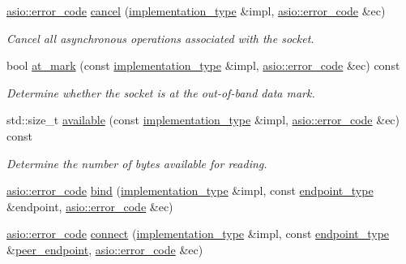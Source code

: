 \begin{DoxyCompactItemize}
\hyperlink{classasio_1_1error__code}{asio\+::error\+\_\+code} \hyperlink{classasio_1_1datagram__socket__service_a8ae47ddb63ad40dc853a53baacf6b25c}{cancel} (\hyperlink{classasio_1_1datagram__socket__service_a41dcdc6b8a3500d6f88e10b6c08925cd}{implementation\+\_\+type} \&impl, \hyperlink{classasio_1_1error__code}{asio\+::error\+\_\+code} \&ec)
\begin{DoxyCompactList}\small\item\em Cancel all asynchronous operations associated with the socket. \end{DoxyCompactList}\item 
bool \hyperlink{classasio_1_1datagram__socket__service_a7eee04dfd3480b1679bad8be2181779b}{at\+\_\+mark} (const \hyperlink{classasio_1_1datagram__socket__service_a41dcdc6b8a3500d6f88e10b6c08925cd}{implementation\+\_\+type} \&impl, \hyperlink{classasio_1_1error__code}{asio\+::error\+\_\+code} \&ec) const 
\begin{DoxyCompactList}\small\item\em Determine whether the socket is at the out-\/of-\/band data mark. \end{DoxyCompactList}\item 
std\+::size\+\_\+t \hyperlink{classasio_1_1datagram__socket__service_a508dd93d78286c1c79b9ea1c41e90bb8}{available} (const \hyperlink{classasio_1_1datagram__socket__service_a41dcdc6b8a3500d6f88e10b6c08925cd}{implementation\+\_\+type} \&impl, \hyperlink{classasio_1_1error__code}{asio\+::error\+\_\+code} \&ec) const 
\begin{DoxyCompactList}\small\item\em Determine the number of bytes available for reading. \end{DoxyCompactList}\item 
\hyperlink{classasio_1_1error__code}{asio\+::error\+\_\+code} \hyperlink{classasio_1_1datagram__socket__service_a6ae78238ea01b961ed10dc77dce35e16}{bind} (\hyperlink{classasio_1_1datagram__socket__service_a41dcdc6b8a3500d6f88e10b6c08925cd}{implementation\+\_\+type} \&impl, const \hyperlink{classasio_1_1datagram__socket__service_a135b71c44f1e92b67cea4402f46578a9}{endpoint\+\_\+type} \&endpoint, \hyperlink{classasio_1_1error__code}{asio\+::error\+\_\+code} \&ec)
\item 
\hyperlink{classasio_1_1error__code}{asio\+::error\+\_\+code} \hyperlink{classasio_1_1datagram__socket__service_a4aa5f2bcb06af07ce67e233acfc4c871}{connect} (\hyperlink{classasio_1_1datagram__socket__service_a41dcdc6b8a3500d6f88e10b6c08925cd}{implementation\+\_\+type} \&impl, const \hyperlink{classasio_1_1datagram__socket__service_a135b71c44f1e92b67cea4402f46578a9}{endpoint\+\_\+type} \&\hyperlink{classasio_1_1datagram__socket__service_ab24dc251be100ee0976e78abfe5946a3}{peer\+\_\+endpoint}, \hyperlink{classasio_1_1error__code}{asio\+::error\+\_\+code} \&ec)

\end{DoxyCompactItemize}

